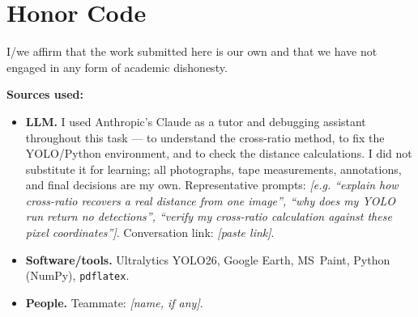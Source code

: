 





\section*{Honor Code}

I/we affirm that the work submitted here is our own and that we have not
engaged in any form of academic dishonesty.

\noindent\textbf{Sources used:}
\begin{itemize}
\item \textbf{LLM.} I used Anthropic's Claude as a tutor and debugging
  assistant throughout this task --- to understand the cross-ratio
  method, to fix the YOLO/Python environment, and to check the
  distance calculations. I did not substitute it for learning; all
  photographs, tape measurements, annotations, and final decisions are
  my own. Representative prompts: \emph{[e.g. ``explain how cross-ratio
  recovers a real distance from one image'', ``why does my YOLO run
  return no detections'', ``verify my cross-ratio calculation against
  these pixel coordinates'']}. Conversation link: \emph{[paste link]}.
\item \textbf{Software/tools.} Ultralytics YOLO26, Google Earth,
  MS~Paint, Python (NumPy), \texttt{pdflatex}.
\item \textbf{People.} Teammate: \emph{[name, if any]}.
\end{itemize}

